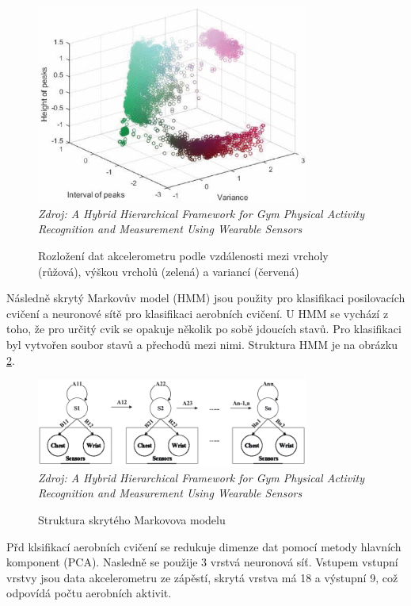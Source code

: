 \begin{figure}[H]
\caption{Rozložení dat akcelerometru podle vzdálenosti mezi vrcholy (růžová), výškou vrcholů (zelená) a variancí (červená)}
\label{fig:analyza:weights1}
\centering
\includegraphics[width=0.8\textwidth]{img/analyzaPA/weights1.png}\\
\textit{Zdroj: A Hybrid Hierarchical Framework for Gym Physical Activity Recognition and Measurement Using Wearable Sensors \citep{analyzaPA.Weights}}
\end{figure}

Následně skrytý Markovův model (HMM) jsou použity pro klasifikaci posilovacích cvičení a neuronové sítě pro klasifikaci aerobních cvičení. U HMM se vychází z toho, že pro určitý cvik se opakuje několik po sobě jdoucích stavů. Pro klasifikaci byl vytvořen soubor stavů a přechodů mezi nimi. Struktura HMM je na obrázku \ref{fig:analyza:hmm}.

\begin{figure}[H]
\caption{Struktura skrytého Markovova modelu}
\label{fig:analyza:hmm}
\centering
\includegraphics[width=0.8\textwidth]{img/analyzaPA/hmm.png}\\
\textit{Zdroj: A Hybrid Hierarchical Framework for Gym Physical Activity Recognition and Measurement Using Wearable Sensors \citep{analyzaPA.Weights}}
\end{figure}

Přd klsifikací aerobních cvičení se redukuje dimenze dat pomocí metody hlavních komponent (PCA). Nasledně se použije 3 vrstvá neuronová síť. Vstupem vstupní vrstvy jsou data akcelerometru ze zápěstí, skrytá vrstva má 18 a výstupní 9, což odpovídá počtu aerobních aktivit.

